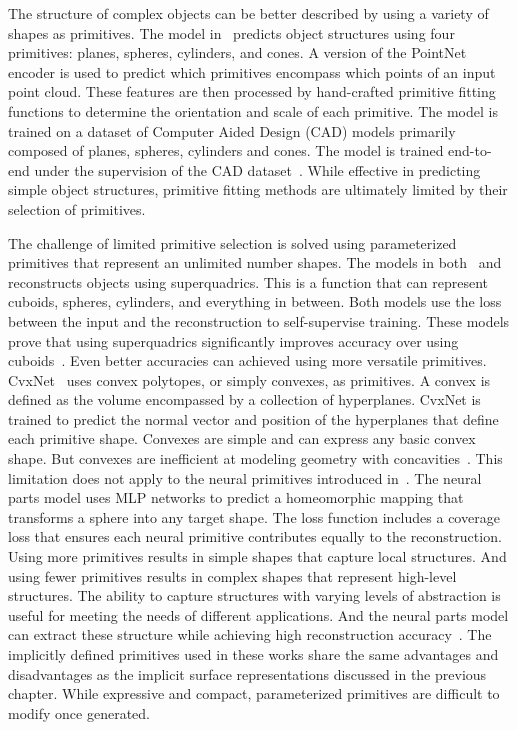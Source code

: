 The structure of complex objects can be better described by using a variety of shapes as primitives. The model in~\cite{Li2019} predicts object structures using four primitives: planes, spheres, cylinders, and cones. A version of the PointNet encoder is used to predict which primitives encompass which points of an input point cloud. These features are then processed by hand-crafted primitive fitting functions to determine the orientation and scale of each primitive. The model is trained on a dataset of Computer Aided Design (CAD) models primarily composed of planes, spheres, cylinders and cones. The model is trained end-to-end under the supervision of the CAD dataset~\cite{Li2019}. While effective in predicting simple object structures, primitive fitting methods are ultimately limited by their selection of primitives.

The challenge of limited primitive selection is solved using parameterized primitives that represent an unlimited number shapes. The models in both~\cite{Paschalidou2019} and~\cite{Paschalidou2020} reconstructs objects using superquadrics. This is a function that can represent cuboids, spheres, cylinders, and everything in between. Both models use the loss between the input and the reconstruction to self-supervise training. These models prove that using superquadrics significantly improves accuracy over using cuboids~\cite{Paschalidou2019}. Even better accuracies can achieved using more versatile primitives. CvxNet~\cite{Deng2020} uses convex polytopes, or simply convexes, as primitives. A convex is defined as the volume encompassed by a collection of hyperplanes. CvxNet is trained to predict the normal vector and position of the hyperplanes that define each primitive shape. Convexes are simple and can express any basic convex shape. But convexes are inefficient at modeling geometry with concavities~\cite{Deng2020}. This limitation does not apply to the neural primitives introduced in~\cite{Paschalidou2021}. The neural parts model uses MLP networks to predict a homeomorphic mapping that transforms a sphere into any target shape. The loss function includes a coverage loss that ensures each neural primitive contributes equally to the reconstruction. Using more primitives results in simple shapes that capture local structures. And using fewer primitives results in complex shapes that represent high-level structures. The ability to capture structures with varying levels of abstraction is useful for meeting the needs of different applications. And the neural parts model can extract these structure while achieving high reconstruction accuracy~\cite{Paschalidou2021}. The implicitly defined primitives used in these works share the same advantages and disadvantages as the implicit surface representations discussed in the previous chapter. While expressive and compact, parameterized primitives are difficult to modify once generated.

